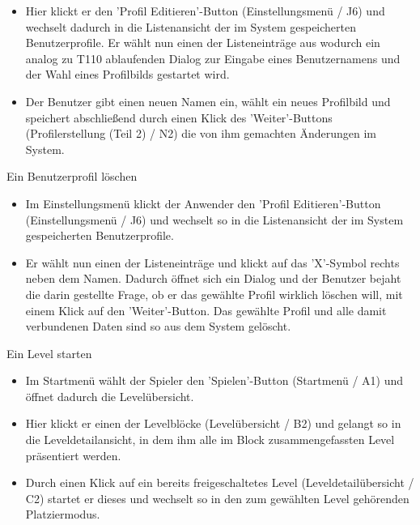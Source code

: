 \begin{requirements}
\begin{itemize}
  			\item Hier klickt er den 'Profil Editieren'-Button (Einstellungsmenü / J6) und wechselt dadurch in die Listenansicht der im System gespeicherten Benutzerprofile. Er wählt nun einen der Listeneinträge aus wodurch ein analog zu T110 ablaufenden Dialog zur Eingabe eines Benutzernamens und der Wahl eines Profilbilds gestartet wird.
  			
  			\item Der Benutzer gibt einen neuen Namen ein, wählt ein neues Profilbild und speichert abschließend durch einen Klick des 'Weiter'-Buttons (Profilerstellung (Teil 2) / N2) die von ihm gemachten Änderungen im System.
  	\end{itemize}
  	
	
	
	 Ein Benutzerprofil löschen
	
	
	\begin{itemize}
  			\item Im Einstellungsmenü klickt der Anwender den 'Profil Editieren'-Button (Einstellungsmenü / J6) und wechselt so in die Listenansicht der im System gespeicherten Benutzerprofile. 
  			
  			\item Er wählt nun einen der Listeneinträge und klickt auf das 'X'-Symbol rechts neben dem Namen. Dadurch öffnet sich ein Dialog und der Benutzer bejaht die darin gestellte Frage, ob er das gewählte Profil wirklich löschen will, mit einem Klick auf den 'Weiter'-Button. Das gewählte Profil und alle damit verbundenen Daten sind so aus dem System gelöscht.
  			
	\end{itemize}
	

	 Ein Level starten
	
	
	\begin{itemize}
  			\item Im Startmenü wählt der Spieler den 'Spielen'-Button (Startmenü / A1) und öffnet dadurch die Levelübersicht.
  			
  			\item Hier klickt er einen der Levelblöcke (Levelübersicht / B2) und gelangt so in die Leveldetailansicht, in dem ihm alle im Block zusammengefassten Level präsentiert werden.
  			
  			\item Durch einen Klick auf ein bereits freigeschaltetes Level (Leveldetailübersicht / C2) startet er dieses und wechselt so in den zum gewählten Level gehörenden Platziermodus.
  	\end{itemize}
  	

\end{requirements}
